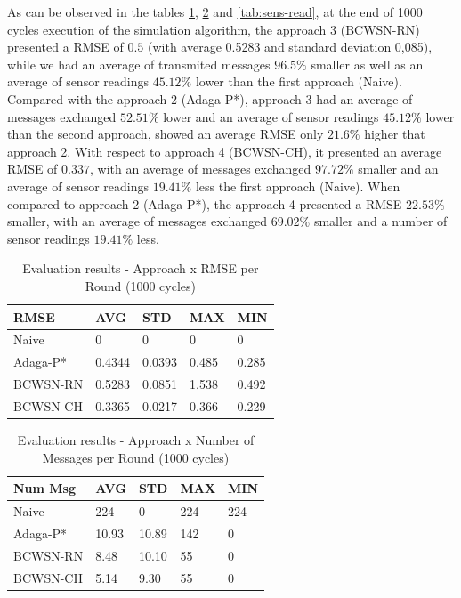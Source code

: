 \documentclass[conference]{IEEEtran}
\begin{document}
As can be observed in the tables \ref{tab:rmse}, \ref{tab:num-msg} and
\ref{tab:sens-read}, at the end of 1000 cycles execution of the simulation
algorithm, the approach 3 (BCWSN-RN) presented a RMSE of $0.5$ (with average
0.5283 and standard deviation 0,085), while we had an average of transmited
messages $96.5\%$ smaller as well as an average of sensor readings $45.12\%$
lower than the first approach (Naive). Compared with the approach 2 (Adaga-P*),
approach 3 had an average of messages exchanged $52.51\%$ lower and an average
of sensor readings $45.12\%$ lower than the second approach, showed an average
RMSE only $21.6\%$ higher that approach 2.
With respect to approach 4 (BCWSN-CH), it presented an average RMSE of $0.337$,
with an average of messages exchanged $97.72\%$ smaller and an average of sensor
readings $19.41\%$ less the first approach (Naive). When compared to approach 2
(Adaga-P*), the approach 4 presented a RMSE $22.53\%$ smaller, with an average
of messages exchanged $69.02\%$ smaller and a number of sensor readings
$19.41\%$ less.

\begin{table}[h!]
\caption{Evaluation results - Approach x RMSE per Round (1000 cycles)}
\label{tab:rmse}
\begin{center}
\begin{tabular}{|l||l|l|l|l|}
\hline
RMSE &AVG &STD &MAX &MIN \\
\hline\hline
Naive &0 &0 &0 &0 \\
\hline
Adaga-P* &0.4344 &0.0393 &0.485 &0.285 \\
\hline
BCWSN-RN &0.5283 &0.0851 &1.538 &0.492 \\
\hline
BCWSN-CH &0.3365 &0.0217 &0.366 &0.229 \\
\hline
\end{tabular}
\end{center}
\end{table}

\begin{table}[h!]
\caption{Evaluation results - Approach x Number of Messages per Round (1000 cycles)}
\label{tab:num-msg}
\begin{center}
\begin{tabular}{|l||l|l|l|l|}
\hline
Num Msg &AVG &STD &MAX &MIN \\
\hline\hline
Naive &224 &0 &224 &224 \\
\hline
Adaga-P* &10.93 &10.89 &142 &0 \\
\hline
BCWSN-RN &8.48 &10.10 &55 &0 \\
\hline
BCWSN-CH &5.14 &9.30 &55 &0 \\
\hline
\end{tabular}
\end{center}
\end{table}
\end{document}
